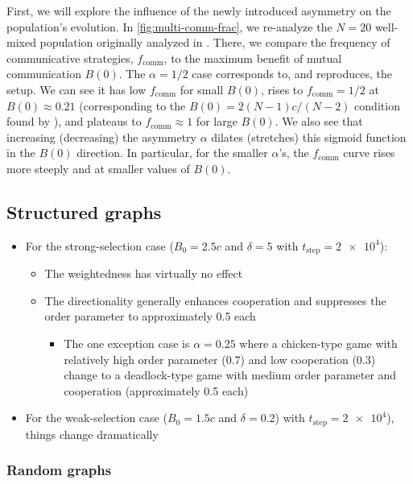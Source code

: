 \documentclass[pdflatex,lineno,referee,sn-mathphys-ay]{sn-jnl}
\begin{document}
First, we will explore the influence of the newly introduced asymmetry
on the population's evolution.
In \cref{fig:multi-comm-frac}, we re-analyze the $N=20$ well-mixed population
originally analyzed in \citet{tripp2022evolutionary}.
There, we compare the frequency of communicative strategies, $f_{\text{comm}}$,
to the maximum benefit of mutual communication $B(0)$.
The $\alpha=1/2$ case corresponds to, and reproduces,
the \citet{tripp2022evolutionary} setup.
We can see it has low $f_{\text{comm}}$ for small $B(0)$,
rises to $f_{\text{comm}} = 1/2$ at $B(0) \approx 0.21$
(corresponding to the $B(0) = 2 (N-1) c/(N-2)$ condition
found by \citet{tripp2022evolutionary}),
and plateaus to $f_{\text{comm}} \approx 1$ for large $B(0)$.
We also see that increasing (decreasing)
the asymmetry $\alpha$ dilates (stretches) this sigmoid function
in the $B(0)$ direction.
In particular, for the smaller $\alpha$'s, the $f_{\text{comm}}$ curve
rises more steeply and at smaller values of $B(0)$.

\subsection{Structured graphs}
\label{sec:structured_graph}
\begin{itemize}
  \item For the strong-selection case ($B_0 = 2.5c$ and $\delta = 5$
    with $t_{\text{step}} = \num{2e4}$):
  \begin{itemize}
    \item The weightedness has virtually no effect
    \item The directionality generally enhances cooperation
      and suppresses the order parameter to approximately
      \num{0.5} each
    \begin{itemize}
      \item The one exception case is $\alpha = \num{0.25}$ where a
        chicken-type game with relatively high order parameter
        (\num{0.7}) and low cooperation (\num{0.3}) change to a
        deadlock-type game with medium order parameter and cooperation
        (approximately \num{0.5} each)
    \end{itemize}
  \end{itemize}
\item For the weak-selection case ($B_0 = 1.5c$ and $\delta = 0.2$) with
  $t_{\text{step}} = \num{2e4}$), things change dramatically
\end{itemize}
\subsubsection{Random graphs}
\label{sec:random_graph}
\end{document}
